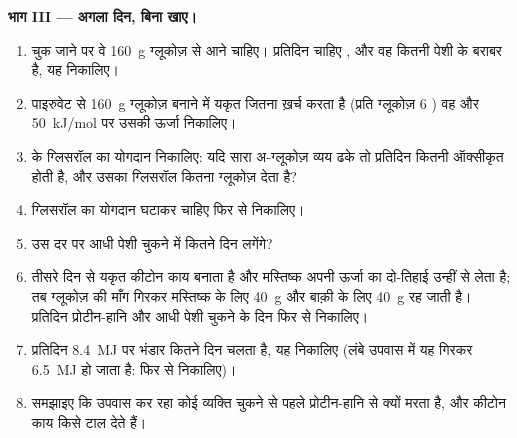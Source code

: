 \begin{problem}
\medskip
\noindent\textbf{भाग III --- अगला दिन, बिना खाए।}
\begin{enumerate}[resume]
  \item {} चुक जाने पर वे \qty{160}{g} ग्लूकोज़  से आने
        चाहिए। प्रतिदिन चाहिए , और वह कितनी पेशी के बराबर है, यह
        निकालिए।
  \item पाइरुवेट से \qty{160}{g} ग्लूकोज़ बनाने में यकृत जितना 
        ख़र्च करता है (प्रति ग्लूकोज़ 6 ) वह और
        \qty{50}{kJ/mol} पर उसकी ऊर्जा निकालिए।
  \item {} के ग्लिसरॉल का योगदान निकालिए: यदि  सारा
        अ-ग्लूकोज़ व्यय ढके तो प्रतिदिन कितनी  ऑक्सीकृत होती है,
        और उसका ग्लिसरॉल कितना ग्लूकोज़ देता है?
  \item ग्लिसरॉल का योगदान घटाकर चाहिए  फिर से निकालिए।
  \item उस दर पर आधी पेशी चुकने में कितने दिन लगेंगे?
  \item तीसरे दिन से यकृत कीटोन काय बनाता है और मस्तिष्क अपनी ऊर्जा का
        दो-तिहाई उन्हीं से लेता है; तब ग्लूकोज़ की माँग गिरकर
        मस्तिष्क के लिए \qty{40}{g} और बाक़ी के लिए \qty{40}{g} रह जाती
        है। प्रतिदिन प्रोटीन-हानि और आधी पेशी चुकने के दिन फिर से
        निकालिए।
  \item प्रतिदिन \qty{8.4}{MJ} पर  भंडार कितने दिन चलता है, यह
        निकालिए (लंबे उपवास में यह गिरकर \qty{6.5}{MJ} हो जाता है: फिर
        से निकालिए)।
  \item समझाइए कि उपवास कर रहा कोई व्यक्ति  चुकने से पहले
        प्रोटीन-हानि से क्यों मरता है, और कीटोन काय किसे टाल देते हैं।
\end{enumerate}


\end{problem}
